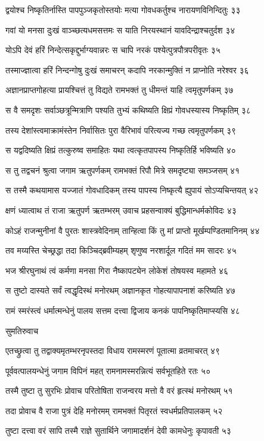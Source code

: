 द्वयोश्च निष्कृतिर्नास्ति पापपुञ्जकृतोस्तयोः
मत्या गोवधकर्तुश्च नारायणविनिन्दितुः ३३

गवां यो मनसा दुःखं वाञ्च्छत्यधमसत्तमः
स याति निरयस्थानं यावदिन्द्राश्चतुर्दश ३४

योऽपि देवं हरिं निन्देत्सकृद्दुर्भाग्यवान्नरः
स चापि नरकं पश्येत्पुत्रपौत्रपरीवृतः ३५

तस्माज्ज्ञात्वा हरिं निन्दन्गोषु दुःखं समाचरन्
कदापि नरकान्मुक्तिं न प्राप्नोति नरेश्वर ३६

अज्ञानप्राप्तगोहत्या प्रायश्चित्तं तु विद्यते
रामभक्तं तु धीमन्तं याहि त्वमृतुपर्णकम् ३७

स वै समदृशः सर्वाञ्छत्रून्मित्राणि पश्यति
तुभ्यं कथिष्यति क्षिप्रं गोवधस्यास्य निष्कृतिम् ३८

तस्य देशांस्त्वमाक्रामंस्तेन निर्वासितः पुरा
वैरिभावं परित्यज्य गच्छ त्वमृतुपर्णकम् ३९

स यद्वदिष्यति क्षिप्रं तत्कुरुष्व समाहितः
यथा त्वत्कृतपापस्य निष्कृतिर्हि भविष्यति ४०

स तु तद्वचनं श्रुत्वा जगाम ऋतुपर्णकम्
रामभक्तं रिपौ मित्रे समदृष्ट्या समञ्जसम् ४१

स तस्मै कथयामास यज्जातं गोवधादिकम्
तस्य पापस्य निष्कृत्यै ह्युपायं सोऽप्यचिन्तयत् ४२

क्षणं ध्यात्वाथ तं राजा ऋतुपर्ण ऋतम्भरम्
उवाच प्रहसन्वाक्यं बुद्धिमान्धर्मकोविदः ४३

कोऽहं राजन्मुनीनां वै पुरतः शास्त्रवेदिनाम्
तान्हित्वा किं तु मां प्राप्तो मूर्खम्पण्डितमानिनम् ४४

तव मय्यस्ति चेच्छ्रद्धा तदा किञ्चिद्ब्रवीम्यहम्
शृणुष्व नरशार्दूल गदितं मम सादरः ४५

भज श्रीरघुनाथं त्वं कर्मणा मनसा गिरा
नैष्कापट्येन लोकेशं तोषयस्व महामते ४६

स तुष्टो दास्यते सर्वं त्वद्धृदिस्थं मनोरथम्
अज्ञानकृत गोहत्यापापनाशं करिष्यति ४७

रामं स्मरंस्त्वं धर्मात्मन्धेनुं पालय सत्तम
दत्त्वा द्विजाय कनकं पापनिष्कृतिमाप्स्यसि ४८

सुमतिरुवाच

एतच्छ्रुत्वा तु तद्वाक्यमृतम्भरनृपस्तदा
विधाय रामस्मरणं पूतात्मा व्रतमाचरत् ४९

पूर्ववत्पालयन्धेनुं जगाम विपिनं महत्
रामनामस्मरन्नित्यं सर्वभूतहिते रतः ५०

तस्मै तुष्टा तु सुरभिः प्रोवाच परितोषिता
राजन्वरय मत्तो वै वरं हृत्स्थं मनोरथम् ५१

तदा प्रोवाच वै राजा पुत्रं देहि मनोरमम्
रामभक्तं पितृरतं स्वधर्मप्रतिपालकम् ५२

तुष्टा दत्त्वा वरं सापि तस्मै राज्ञे सुतार्थिने
जगामादर्शनं देवी कामधेनुः कृपावती ५३

